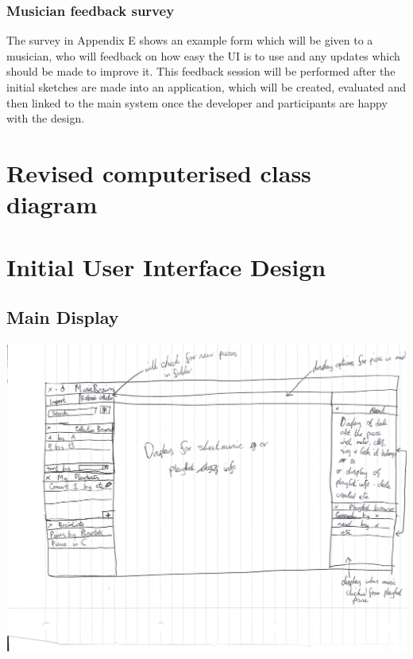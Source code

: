 \documentclass[bibtotocnumbered]{article}
\begin{document}
\subsubsection{Musician feedback survey}
The survey in Appendix E shows an example form which will be given to a musician, who will feedback on how easy the UI is to use and any updates which should be made to improve it. This feedback session will be performed after the initial sketches are made into an application, which will be created, evaluated and then linked to the main system once the developer and participants are happy with the design.
\begin{appendices}
\section{Revised computerised class diagram}
\section{Initial User Interface Design}
\subsection{Main Display}
\includegraphics[width=500pt]{main_view.png}

\end{appendices}
\end{document}

